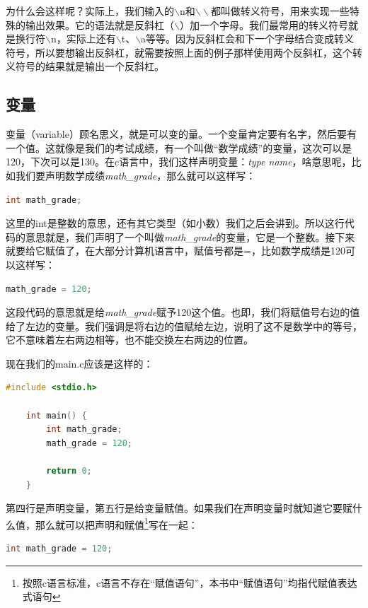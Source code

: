 为什么会这样呢？实际上，我们输入的$\backslash$n和$\backslash{}\backslash$都叫做转义符号，用来实现一些特殊的输出效果。它的语法就是反斜杠（$\backslash$）加一个字母。我们最常用的转义符号就是换行符$\backslash$n，实际上还有$\backslash$t、$\backslash$a等等。因为反斜杠会和下一个字母结合变成转义符号，所以要想输出反斜杠，就需要按照上面的例子那样使用两个反斜杠，这个转义符号的结果就是输出一个反斜杠。

\subsection{变量}

变量（variable）顾名思义，就是可以变的量。一个变量肯定要有名字，然后要有一个值。这就像是我们的考试成绩，有一个叫做“数学成绩”的变量，这次可以是120，下次可以是130。在c语言中，我们这样声明变量：\textit{type name}，啥意思呢，比如我们要声明数学成绩\textit{math\_grade}，那么就可以这样写：

\begin{lstlisting}[language=C]
    int math_grade; 
\end{lstlisting}

这里的int是整数的意思，还有其它类型（如小数）我们之后会讲到。所以这行代码的意思就是，我们声明了一个叫做\textit{math\_grade}的变量，它是一个整数。接下来就要给它赋值了，在大部分计算机语言中，赋值号都是=，比如数学成绩是120可以这样写：

\begin{lstlisting}[language=C]
    math_grade = 120;
\end{lstlisting}

这段代码的意思就是给\textit{math\_grade}赋予120这个值。也即，我们将赋值号右边的值给了左边的变量。我们强调是将右边的值赋给左边，说明了这不是数学中的等号，它不意味着左右两边相等，也不能交换左右两边的位置。

现在我们的main.c应该是这样的：

\begin{lstlisting}[language=C]
    #include <stdio.h>

    int main() {
        int math_grade;
        math_grade = 120;

        return 0;
    }
\end{lstlisting}

第四行是声明变量，第五行是给变量赋值。如果我们在声明变量时就知道它要赋什么值，那么就可以把声明和赋值\footnote{按照c语言标准，c语言不存在“赋值语句”，本书中“赋值语句”均指代赋值表达式语句}写在一起：

\begin{lstlisting}[language=C]
    int math_grade = 120;
\end{lstlisting}

